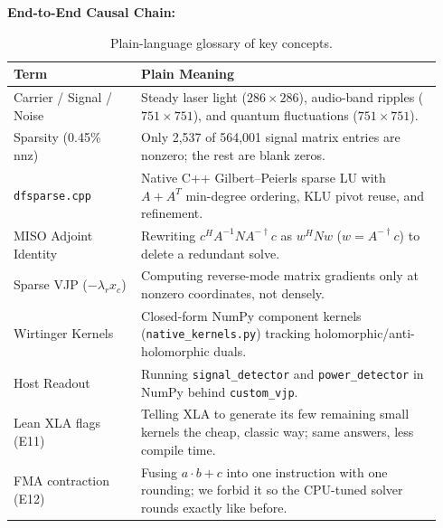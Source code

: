 \documentclass[11pt,a4paper]{article}
\begin{document}
\textbf{End-to-End Causal Chain:}
\begin{center}
\small
{}
\end{center}

\begin{table}[h]
\centering
\small
\begin{tabular}{@{}p{0.28\linewidth}p{0.66\linewidth}@{}}
\toprule
\textbf{Term} & \textbf{Plain Meaning} \\
\midrule
Carrier / Signal / Noise & Steady laser light ($286\times 286$), audio-band ripples ($751\times 751$), and quantum fluctuations ($751\times 751$). \\
Sparsity (0.45\% nnz) & Only 2,537 of 564,001 signal matrix entries are nonzero; the rest are blank zeros. \\
\texttt{dfsparse.cpp} & Native C++ Gilbert--Peierls sparse LU with $A+A^T$ min-degree ordering, KLU pivot reuse, and refinement. \\
MISO Adjoint Identity & Rewriting $c^H A^{-1} N A^{-\dagger} c$ as $w^H N w$ ($w = A^{-\dagger} c$) to delete a redundant solve. \\
Sparse VJP ($-\lambda_r x_c$) & Computing reverse-mode matrix gradients only at nonzero coordinates, not densely. \\
Wirtinger Kernels & Closed-form NumPy component kernels (\texttt{native\_kernels.py}) tracking holomorphic/anti-holomorphic duals. \\
Host Readout & Running \texttt{signal\_detector} and \texttt{power\_detector} in NumPy behind \texttt{custom\_vjp}. \\
Lean XLA flags (E11) & Telling XLA to generate its few remaining small kernels the cheap, classic way; same answers, less compile time. \\
FMA contraction (E12) & Fusing $a\cdot b + c$ into one instruction with one rounding; we forbid it so the CPU-tuned solver rounds exactly like before. \\
\bottomrule
\end{tabular}
\caption{Plain-language glossary of key concepts.}
\label{tab:glossary}
\end{table}
\end{document}
